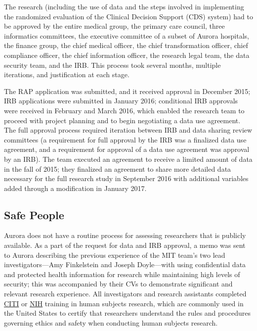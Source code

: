 The research (including the use of data and the steps involved in implementing the randomized evaluation of the Clinical Decision Support (CDS) system) had to be approved by the entire medical group, the primary care council, three informatics committees, the executive committee of a subset of Aurora hospitals, the finance group, the chief medical officer, the chief transformation officer, chief compliance officer, the chief information officer, the research legal team, the data security team, and the IRB. This process took several months, multiple iterations, and justification at each stage.

The RAP application was submitted, and it received approval in December 2015; IRB applications were submitted in January 2016; conditional IRB approvals were received in February and March 2016, which enabled the research team to proceed with project planning and to begin negotiating a data use agreement. The full approval process required iteration between IRB and data sharing review committees (a requirement for full approval by the IRB was a finalized data use agreement, and a requirement for approval of a data use agreement was approval by an IRB). The team executed an agreement to receive a limited amount of data in the fall of 2015; they finalized an agreement to share more detailed data necessary for the full research study in September 2016 with additional variables added through a modification in January 2017.

\hypertarget{safe-people-3}{%
\subsection{Safe People}\label{safe-people-3}}

Aurora does not have a routine process for assessing researchers that is publicly available. As a part of the request for data and IRB approval, a memo was sent to Aurora describing the previous experience of the MIT team's two lead investigators---Amy Finkelstein and Joseph Doyle---with using confidential data and protected health information for research while maintaining high levels of security; this was accompanied by their CVs to demonstrate significant and relevant research experience. All investigators and research assistants completed \href{https://about.citiprogram.org/en/homepage/}{CITI} or \href{https://nexus.od.nih.gov/all/2018/09/07/protecting-human-research-participants-phrp-online-tutorial-no-longer-available-as-of-september-26-2018/}{NIH} training in human subjects research, which are commonly used in the United States to certify that researchers understand the rules and procedures governing ethics and safety when conducting human subjects research.

